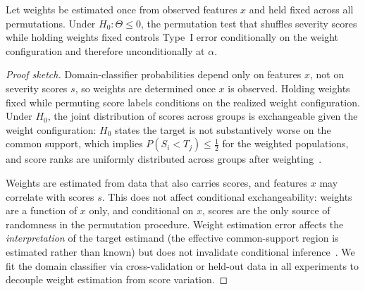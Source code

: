 \begin{proposition}\label{prop:permutation}
Let weights be estimated once from observed features $x$ and held fixed across all permutations. Under $H_0\colon \Theta \leq 0$, the permutation test that shuffles severity scores while holding weights fixed controls Type~I error conditionally on the weight configuration and therefore unconditionally at $\alpha$.
\end{proposition}

\begin{proof}[Proof sketch]
Domain-classifier probabilities depend only on features $x$, not on severity scores $s$, so weights are determined once $x$ is observed. Holding weights fixed while permuting score labels conditions on the realized weight configuration. Under $H_0$, the joint distribution of scores across groups is exchangeable given the weight configuration: $H_0$ states the target is not substantively worse on the common support, which implies $P(S_i < T_j) \leq \tfrac12$ for the weighted populations, and score ranks are uniformly distributed across groups after weighting~\cite[Section~5.8]{Lehmann_2005}.

Weights are estimated from data that also carries scores, and features $x$ may correlate with scores $s$. This does not affect conditional exchangeability: weights are a function of $x$ only, and conditional on $x$, scores are the only source of randomness in the permutation procedure. Weight estimation error affects the \emph{interpretation} of the target estimand (the effective common-support region is estimated rather than known) but does not invalidate conditional inference~\cite{Lehmann_2005}. We fit the domain classifier via cross-validation or held-out data in all experiments to decouple weight estimation from score variation.
\end{proof}


